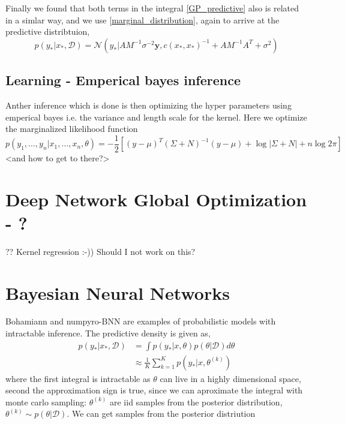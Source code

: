Finally we found that both terms in the integral \eqref{GP_predictive} also is related
in a simlar way, and we use \eqref{marginal_distribution}, again to arrive at the predictive
distribtuion, 
$$p(y_*|x_*,\mathcal{D}) = \mathcal{N}(y_*|AM^{-1}\sigma^{-2}\textbf{y}, c(x_*, x_*)^{-1}+
AM^{-1}A^T+\sigma^2)$$


\subsection*{Learning - Emperical bayes inference}

Anther inference which is done is then optimizing the hyper parameters using emperical bayes i.e.
the variance and length scale for the kernel. Here we optimize the marginalized likelihood function
$$p(y_1, \dots, y_n|x_1, \dots, x_n, \theta) = -\frac{1}{2}[(y-\mu)^T (\Sigma+N)^{-1}(y-\mu)+ \log |\Sigma+N|+n \log 2\pi]$$
<and how to get to there?>


\section{Deep Network Global Optimization - ?} ??
Kernel regression :-))
Should I not work on this?

\section{Bayesian Neural Networks}
Bohamiann and numpyro-BNN are examples of probabilistic models with intractable inference. The predictive density is given as, 
\begin{align*}
    p(y_*|x_*,\mathcal{D}) &= \int p(y_*|x, \theta)p(\theta|\mathcal{D})d\theta\\
    &\approx \frac{1}{K} \sum_{k=1}^K p(y_*|x, \theta^{(k)})
\end{align*}
where the first integral is intractable as $\theta$ can live in a highly dimensional space, second the approximation sign
is true, since we can aproximate the integral with monte carlo sampling: $\theta^{(k)}$ are iid samples from the posterior 
distribution, $\theta^{(k)} \sim p(\theta|\mathcal{D})$. We can get samples from the posterior distriution

